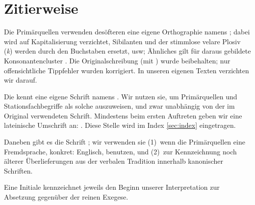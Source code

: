 \section*{Zitierweise}

Die Primärquellen verwenden desöfteren  eine eigene Orthographie namens  ; dabei wird auf Kapitalisierung verzichtet,  Sibilanten und der stimmlose velare Plosiv (\emph{k}) werden durch den Buchstaben  ersetzt, usw; Ähnliches gilt für daraus gebildete Konsonantencluster \cite[S.~46]{cbasebook}  \cite{clang}. Die Originalschreibung (mit ) wurde beibehalten; nur offensichtliche Tippfehler wurden korrigiert. In unseren eigenen Texten verzichten wir darauf.

Die  kennt eine eigene Schrift namens . Wir nutzen sie, um Primärquellen und Stationsfachbegriffe als solche auszuweisen, und zwar unabhängig von der im Original verwendeten Schrift. Mindestens beim ersten Auftreten geben wir eine lateinische Umschrift an: . Diese Stelle wird im Index \cref{sec:index} eingetragen.


Daneben gibt es die Schrift ; wir verwenden sie (1)~wenn die Primärquellen eine Fremdsprache, konkret: Englisch, benutzen, und (2)~zur Kennzeichnung noch älterer Überlieferungen aus der verbalen Tradition innerhalb kanonischer Schriften.

Eine Initiale kennzeichnet jeweils den Beginn unserer Interpretation zur Absetzung gegenüber der reinen Exegese.


